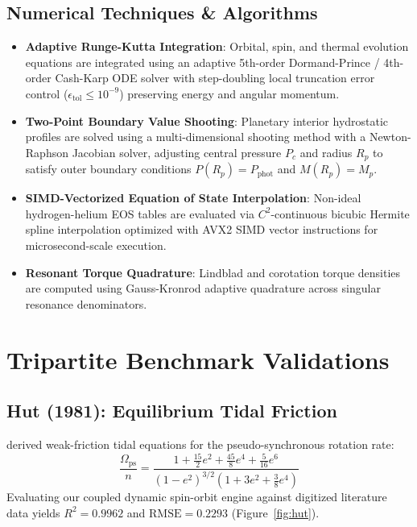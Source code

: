 \documentclass[twocolumn,10pt,a4paper]{article}
\begin{document}
\subsection{Numerical Techniques \& Algorithms}
\begin{itemize}
    \item \textbf{Adaptive Runge-Kutta Integration}: Orbital, spin, and thermal evolution equations are integrated using an adaptive 5th-order Dormand-Prince / 4th-order Cash-Karp ODE solver with step-doubling local truncation error control ($\epsilon_{\text{tol}} \le 10^{-9}$) preserving energy and angular momentum.
    \item \textbf{Two-Point Boundary Value Shooting}: Planetary interior hydrostatic profiles are solved using a multi-dimensional shooting method with a Newton-Raphson Jacobian solver, adjusting central pressure $P_c$ and radius $R_p$ to satisfy outer boundary conditions $P(R_p) = P_{\text{phot}}$ and $M(R_p) = M_p$.
    \item \textbf{SIMD-Vectorized Equation of State Interpolation}: Non-ideal hydrogen-helium EOS tables are evaluated via $C^2$-continuous bicubic Hermite spline interpolation optimized with AVX2 SIMD vector instructions for microsecond-scale execution.
    \item \textbf{Resonant Torque Quadrature}: Lindblad and corotation torque densities are computed using Gauss-Kronrod adaptive quadrature across singular resonance denominators.
\end{itemize}

\section{Tripartite Benchmark Validations}

\subsection{Hut (1981): Equilibrium Tidal Friction}
\citet{Hut1981} derived weak-friction tidal equations for the pseudo-synchronous rotation rate:
\begin{equation}
\frac{\Omega_{\text{ps}}}{n} = \frac{1 + \frac{15}{2}e^2 + \frac{45}{8}e^4 + \frac{5}{16}e^6}{(1 - e^2)^{3/2} \left( 1 + 3e^2 + \frac{3}{8}e^4 \right)}
\end{equation}
Evaluating our coupled dynamic spin-orbit engine against digitized literature data yields $R^2 = 0.9962$ and $\text{RMSE} = 0.2293$ (Figure~\ref{fig:hut}).
\end{document}
